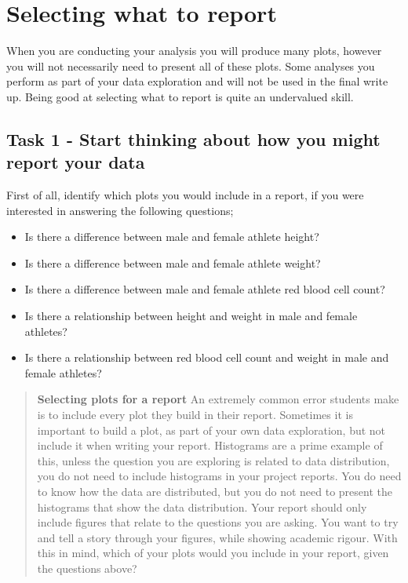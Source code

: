 \documentclass[
]{book}
\providecommand{\tightlist}{%
  \setlength{\itemsep}{0pt}\setlength{\parskip}{0pt}}
\begin{document}
\hypertarget{selecting-what-to-report}{%
\section{Selecting what to report}\label{selecting-what-to-report}}

When you are conducting your analysis you will produce many plots, however you will not necessarily need to present all of these plots. Some analyses you perform as part of your data exploration and will not be used in the final write up. Being good at selecting what to report is quite an undervalued skill.

\hypertarget{task-1---start-thinking-about-how-you-might-report-your-data}{%
\subsection{Task 1 - Start thinking about how you might report your data}\label{task-1---start-thinking-about-how-you-might-report-your-data}}

First of all, identify which plots you would include in a report, if you were interested in answering the following questions;

\begin{itemize}
\tightlist
\item
  Is there a difference between male and female athlete height?
\item
  Is there a difference between male and female athlete weight?
\item
  Is there a difference between male and female athlete red blood cell count?
\item
  Is there a relationship between height and weight in male and female athletes?
\item
  Is there a relationship between red blood cell count and weight in male and female athletes?
\end{itemize}

\begin{quote}
\textbf{Selecting plots for a report}
An extremely common error students make is to include every plot they build in their report. Sometimes it is important to build a plot, as part of your own data exploration, but not include it when writing your report. Histograms are a prime example of this, unless the question you are exploring is related to data distribution, you do not need to include histograms in your project reports. You do need to know how the data are distributed, but you do not need to present the histograms that show the data distribution. Your report should only include figures that relate to the questions you are asking. You want to try and tell a story through your figures, while showing academic rigour. With this in mind, which of your plots would you include in your report, given the questions above?
\end{quote}
\end{document}
